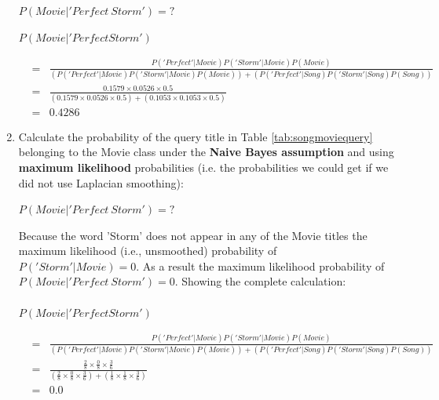 \documentclass[solution]{ditpaper}
\begin{document}
\begin{enumerate}
			\begin{center}
				$P(Movie|'Perfect~Storm')=?$
			\end{center}
			\begin{answer}
				$P(Movie|'Perfect Storm')$ 
				\begin{scriptsize}
				\begin{eqnarray*}
					&=& \frac{P('Perfect'|Movie)P('Storm'|Movie)P(Movie)}{(P('Perfect'|Movie)P('Storm'|Movie)P(Movie))+(P('Perfect'|Song)P('Storm'|Song)P(Song))}\\
					&=& \frac{0.1579 \times 0.0526 \times 0.5}{(0.1579 \times 0.0526 \times 0.5) + (0.1053 \times 0.1053 \times 0.5)}\\
					&=& 0.4286
				\end{eqnarray*}
				\end{scriptsize}
			\end{answer}
		\item Calculate the probability of the query title in Table \ref{tab:songmoviequery} belonging to the Movie class under the \textbf{Naive Bayes assumption} and using \textbf{maximum likelihood} probabilities (i.e. the probabilities we could get if we did not use Laplacian smoothing):	
					\begin{center}
				$P(Movie|'Perfect~Storm')=?$
			\end{center}
			\marks{4}
			\begin{answer}
				Because the word 'Storm' does not appear in any of the Movie titles the maximum likelihood (i.e., unsmoothed) probability of $P('Storm'|Movie)=0$. As a result the maximum likelihood probability of $P(Movie|'Perfect~Storm')=0$. Showing the complete calculation: \\
				\\
				$P(Movie|'Perfect Storm')$
				\begin{scriptsize}
				\begin{eqnarray*}
					 &=& \frac{P('Perfect'|Movie)P('Storm'|Movie)P(Movie)}{(P('Perfect'|Movie)P('Storm'|Movie)P(Movie))+(P('Perfect'|Song)P('Storm'|Song)P(Song))}\\
					&=& \frac{\frac{2}{8} \times \frac{0}{8} \times \frac{3}{6}}{(\frac{2}{8} \times \frac{0}{8} \times \frac{3}{6}) + (\frac{1}{8} \times \frac{1}{8} \times \frac{3}{6})}\\
					&=& 0.0
				\end{eqnarray*}
				\end{scriptsize}
			\end{answer}
	\end{enumerate}
%
\newpage
\end{document}
